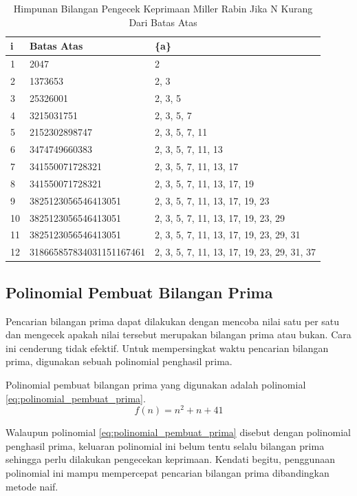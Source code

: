 \begin{table}[h!]
	\caption{Himpunan Bilangan Pengecek Keprimaan Miller Rabin Jika N Kurang Dari Batas Atas}
	\label{tab:miller_rabin_deterministic_a}
	\ttfamily
	\begin{tabularx}{\linewidth}{ |l|l|X| }
		\hline
		i&	Batas Atas&	\{a\} \\
		\hline
		1&	2047&	2 \\
		2&	1373653&	2, 3 \\
		3&	25326001&	2, 3, 5 \\
		4&	3215031751&	2, 3, 5, 7 \\
		5&	2152302898747&	2, 3, 5, 7, 11 \\
		6&	3474749660383&	2, 3, 5, 7, 11, 13 \\
		7&	341550071728321&	2, 3, 5, 7, 11, 13, 17 \\
		8&	341550071728321&	2, 3, 5, 7, 11, 13, 17, 19 \\
		9&	3825123056546413051&	2, 3, 5, 7, 11, 13, 17, 19, 23 \\
		10&	3825123056546413051&	2, 3, 5, 7, 11, 13, 17, 19, 23, 29 \\
		11&	3825123056546413051&	2, 3, 5, 7, 11, 13, 17, 19, 23, 29, 31 \\
		12&	318665857834031151167461&	2, 3, 5, 7, 11, 13, 17, 19, 23, 29, 31, 37 \\
		\hline
	\end{tabularx}
\end{table}

\subsection{Polinomial Pembuat Bilangan Prima}

Pencarian bilangan prima dapat dilakukan dengan mencoba nilai satu per satu dan mengecek apakah nilai tersebut merupakan bilangan prima atau bukan. Cara ini cenderung tidak efektif. Untuk mempersingkat waktu pencarian bilangan prima, digunakan sebuah polinomial penghasil prima.

Polinomial pembuat bilangan prima yang digunakan adalah polinomial \eqref{eq:polinomial_pembuat_prima}. \cite{wolfram_prime_polynomial}
\begin{equation}
f(n)=n^2+n+41
\label{eq:polinomial_pembuat_prima}
\end{equation}

Walaupun polinomial \eqref{eq:polinomial_pembuat_prima} disebut dengan polinomial penghasil prima, keluaran polinomial ini belum tentu selalu bilangan prima sehingga perlu dilakukan pengecekan keprimaan. Kendati begitu, penggunaan polinomial ini mampu mempercepat pencarian bilangan prima dibandingkan metode naif.
